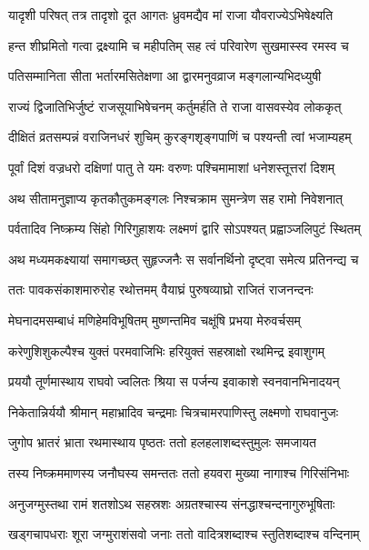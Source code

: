 \twolineshloka
{यादृशी परिषत् तत्र तादृशो दूत आगतः}
{ध्रुवमद्यैव मां राजा यौवराज्येऽभिषेक्ष्यति} %

\twolineshloka
{हन्त शीघ्रमितो गत्वा द्रक्ष्यामि च महीपतिम्}
{सह त्वं परिवारेण सुखमास्स्व रमस्व च} %

\twolineshloka
{पतिसम्मानिता सीता भर्तारमसितेक्षणा}
{आ द्वारमनुवव्राज मङ्गलान्यभिदध्युषी} %

\twolineshloka
{राज्यं द्विजातिभिर्जुष्टं राजसूयाभिषेचनम्}
{कर्तुमर्हति ते राजा वासवस्येव लोककृत्} %

\twolineshloka
{दीक्षितं व्रतसम्पन्नं वराजिनधरं शुचिम्}
{कुरङ्गशृङ्गपाणिं च पश्यन्ती त्वां भजाम्यहम्} %

\twolineshloka
{पूर्वां दिशं वज्रधरो दक्षिणां पातु ते यमः}
{वरुणः पश्चिमामाशां धनेशस्तूत्तरां दिशम्} %

\twolineshloka
{अथ सीतामनुज्ञाप्य कृतकौतुकमङ्गलः}
{निश्चक्राम सुमन्त्रेण सह रामो निवेशनात्} %

\twolineshloka
{पर्वतादिव निष्क्रम्य सिंहो गिरिगुहाशयः}
{लक्ष्मणं द्वारि सोऽपश्यत् प्रह्वाञ्जलिपुटं स्थितम्} %

\twolineshloka
{अथ मध्यमकक्ष्यायां समागच्छत् सुहृज्जनैः}
{स सर्वानर्थिनो दृष्ट्वा समेत्य प्रतिनन्द्य च} %

\twolineshloka
{ततः पावकसंकाशमारुरोह रथोत्तमम्}
{वैयाघ्रं पुरुषव्याघ्रो राजितं राजनन्दनः} %

\twolineshloka
{मेघनादमसम्बाधं मणिहेमविभूषितम्}
{मुष्णन्तमिव चक्षूंषि प्रभया मेरुवर्चसम्} %

\twolineshloka
{करेणुशिशुकल्पैश्च युक्तं परमवाजिभिः}
{हरियुक्तं सहस्राक्षो रथमिन्द्र इवाशुगम्} %

\twolineshloka
{प्रययौ तूर्णमास्थाय राघवो ज्वलितः श्रिया}
{स पर्जन्य इवाकाशे स्वनवानभिनादयन्} %

\twolineshloka
{निकेतान्निर्ययौ श्रीमान् महाभ्रादिव चन्द्रमाः}
{चित्रचामरपाणिस्तु लक्ष्मणो राघवानुजः} %

\twolineshloka
{जुगोप भ्रातरं भ्राता रथमास्थाय पृष्ठतः}
{ततो हलहलाशब्दस्तुमुलः समजायत} %

\twolineshloka
{तस्य निष्क्रममाणस्य जनौघस्य समन्ततः}
{ततो हयवरा मुख्या नागाश्च गिरिसंनिभाः} %

\twolineshloka
{अनुजग्मुस्तथा रामं शतशोऽथ सहस्रशः}
{अग्रतश्चास्य संनद्धाश्चन्दनागुरुभूषिताः} %

\twolineshloka
{खड्गचापधराः शूरा जग्मुराशंसवो जनाः}
{ततो वादित्रशब्दाश्च स्तुतिशब्दाश्च वन्दिनाम्} %

